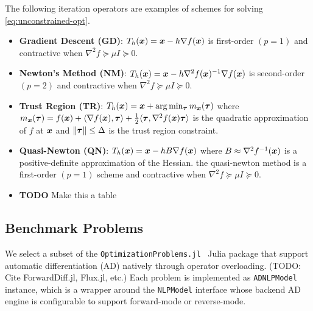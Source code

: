 \documentclass[10pt]{article}
\begin{document}
        The following iteration operators are examples of schemes for solving
        \eqref{eq:unconstrained-opt}.
        \begin{itemize}
            \item \textbf{Gradient Descent (GD)}: $T_h(\bm{x}) = \bm{x} - h \nabla f(\bm{x})$
            is first-order $(p = 1)$ and contractive when $\nabla^2 f \succeq \mu I \succeq 0$.
            \item \textbf{Newton's Method (NM)}: $T_h(\bm{x}) = \bm{x} - h \nabla^2 f(\bm{x})^{-1} \nabla f(\bm{x})$
            is second-order $(p = 2)$ and contractive when $\nabla^2 f \succeq \mu I \succeq 0$.
            \item \textbf{Trust Region (TR)}: $T_h(\bm{x}) = \bm{x} + \arg \min_{\bm{\tau}} m_{\bm{x}}(\bm{\tau})$
            where $m_{\bm{x}}(\bm{\tau}) = f(\bm{x}) + \langle \nabla f(\bm{x}), \bm{\tau} \rangle +
            \frac{1}{2} \langle \bm{\tau}, \nabla^2 f(\bm{x}) \bm{\tau} \rangle$ is the quadratic approximation
            of $f$ at $\bm{x}$ and $\|\bm{\tau}\| \leq \Delta$ is the trust region constraint.
            \item \textbf{Quasi-Newton (QN)}: $T_h(\bm{x}) = \bm{x} - h B \nabla f(\bm{x})$ where
            $B \approx \nabla^2 f^{-1}(\bm{x})$ is a positive-definite approximation of the Hessian.
            the quasi-newton method is a first-order $(p = 1)$ scheme and contractive when
            $\nabla^2 f \succeq \mu I \succeq 0$.
            \item \textbf{TODO} Make this a table
        \end{itemize}
    

    \subsection{Benchmark Problems}
        \label{intro:problems}
        We select a subset of the \texttt{OptimizationProblems.jl}~\cite{OptimizationProblems}
        Julia package that support automatic differentiation (AD) natively through operator
        overloading. (TODO: Cite ForwardDiff.jl, Flux.jl, etc.) Each problem is implemented
        as \texttt{ADNLPModel} instance, which is a wrapper around the \texttt{NLPModel} interface
        whose backend AD engine is configurable to support forward-mode or reverse-mode.



    

    
\end{document}
